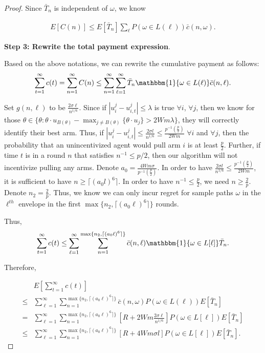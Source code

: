 \documentclass[twoside,11pt]{article}
\begin{document}
\begin{proof}
Since $\bar{T}_{n}$ is independent of $\omega$, we know

\begin{align}
E[C(n)]\leq E[\bar{T}_{n}]\sum_{\ell}P(\omega\in L(\ell))\bar{c}(n,\omega). \nonumber
\end{align}

\noindent\textbf{Step 3: Rewrite the total payment expression}.

Based on the above notations, we can rewrite the cumulative payment as follows:
\begin{align}
\sum_{t=1}^{\infty}c(t) =\sum_{n=1}^{\infty}C(n)
\leq  \sum_{n=1}^{\infty}\sum_{\ell=1}^{\infty}\bar{T}_{n}\mathbbm{1}\{\omega\in L(\ell)\}\bar{c}(n,\ell). \nonumber
\end{align}

Set $g(n,\ell)$ to be $\frac{2\sigma \ell}{n^{1/6}}$. Since if $|u_{i}^{j}-u_{i,t}^{j}|\leq \lambda$ is true $\forall i$, $\forall j$, then we know for those $\theta\in \{\theta:\theta\cdot u_{B(\theta)}-\max_{j\neq B(\theta)}\{\theta \cdot u_{j}\}> 2Wm\lambda\}$, they will correctly identify their best arm. Thus, if $|u_{i}^{j}-u_{i,t}^{j}|\leq \frac{2\sigma l}{n^{1/6}} \leq \frac{p^{-1}(\frac{p}{2})}{2Wm}$ $\forall i$ and $\forall j$, then the probability that an unincentivized agent would pull arm $i$ is at least $\frac{p}{2}$. Further, if time $t$ is in a round $n$ that satisfies $n^{-1}\leq p/2$, then our algorithm will not incentivize pulling any arms. Denote $a_0=\frac{4Wm\sigma}{p^{-1}(\frac{p}{2})}$. In order to have $\frac{2\sigma l}{n^{1/6}}\leq \frac{p^{-1}(\frac{p}{2})}{2Wm}$, it is sufficient to have $n\geq \lceil (a_{0} l)^6 \rceil$. In order to have $n^{-1}\leq \frac{p}{2}$, we need $n\geq \frac{2}{p}$. Denote $n_2=\frac{2}{p}$. Thus, we know we can only incur regret for sample paths $\omega$ in the $\ell^{th}$ envelope in the first $\max\{n_2,\lceil (a_0 \ell)^6 \rceil\}$ rounds.

Thus,
\begin{align}
\sum_{t=1}^{\infty}c(t)\leq\sum_{\ell=1}^{\infty}\sum_{n=1}^{\max\{n_2,\lceil (a_0 \ell)^6 \rceil\}}\bar{c}(n,\ell)\mathbbm{1}\{\omega\in L[\ell]\}\bar{T}_{n}. \nonumber
\end{align}

Therefore,

\begin{align}
&E\left[\sum_{t=1}^{\infty}c(t)\right] \nonumber\\
\leq &\sum_{\ell=1}^{\infty}\sum_{n=1}^{\max\{n_2,\lceil (a_0 \ell)^6 \rceil\}}\bar{c}(n,\omega)P(\omega \in L(\ell))E[\bar{T}_{n}] \nonumber \\
=&\sum_{\ell=1}^{\infty}\sum_{n=1}^{\max\{n_2,\lceil (a_0 \ell)^6 \rceil\}}\left[R+2Wm\frac{2\sigma \ell}{n^{1/6}}\right]P(\omega\in L[\ell])E[\bar{T}_{n}] \nonumber \\
\leq &\sum_{\ell=1}^{\infty}\sum_{n=1}^{\max\{n_2,\lceil (a_0 \ell)^6 \rceil\}}\left[R+4Wm\sigma l\right]P(\omega\in L[\ell])E[\bar{T}_{n}]. \nonumber
\end{align}




\end{proof}
\end{document}

